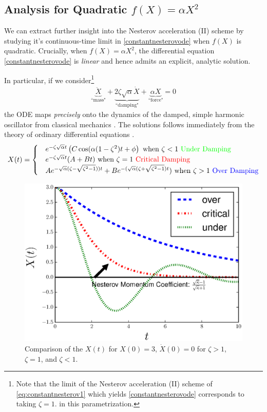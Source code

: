 \subsection{Analysis for Quadratic $f(X) = \alpha X^2$ }

We can extract further insight into the Nesterov acceleration (II) scheme by studying it's continuous-time limit in \eqref{constantnesterovode} when $f(X)$ is quadratic. Crucially, when $f(X) = \alpha X^2$, the differential equation \eqref{constantnesterovode} is \textit{linear} and hence admits an explicit, analytic solution. 

In particular, if we consider\footnote{Note that the limit of the Nesterov acceleration (II) scheme of \eqref{eq:constantnesterov1} which yields \eqref{constantnesterovode} corresponds to taking $\zeta=1$. in this parametrization.}
\begin{align*}
   \underbrace{\ddot{X}}_{\text{``mass"}} + \underbrace{2 \zeta \sqrt{\alpha} \dot{X}}_{\text{``damping"}} + \underbrace{\alpha X}_{\text{``force"}} = 0
\end{align*}
the ODE maps \textit{precisely} onto the dynamics of the damped, simple harmonic oscillator from classical mechanics \citep{morin2008introduction}. The solutions follows immediately from the theory of ordinary differential equations \citep{morin2008introduction}.  
\begin{align*}
   X(t) = \begin{cases}
   & e^{-\zeta \sqrt{\alpha} t} \left( C \cos(\alpha(1-\zeta^2) t+\phi \right) \text{ when } \zeta < 1 \ \textcolor{green}{\text{Under Damping}}  \\
   & e^{-\zeta \sqrt{\alpha} t}(A+B t) \text{ when } \zeta = 1 \ \textcolor{red}{\text{Critical Damping}} \\
   & A e^{-\sqrt{\alpha}(\zeta - \sqrt{\zeta^2-1})) t}+ B e^{ -(\sqrt{\alpha}(\zeta + \sqrt{\zeta^2-1}) t})   \text{ when } \zeta > 1 \ \textcolor{blue}{\text{Over Damping}} 
   \end{cases}
\end{align*}

\begin{figure}[!h]
\begin{center}
\includegraphics[width=0.6\linewidth]{Experiments/critical_damp_Nesterov.eps}
\caption{Comparison of the $X(t)$ for $X(0)=3$, $\dot{X}(0)=0$ for $\zeta > 1$, $\zeta=1$, and $\zeta < 1$.}
\end{center}
\end{figure}

